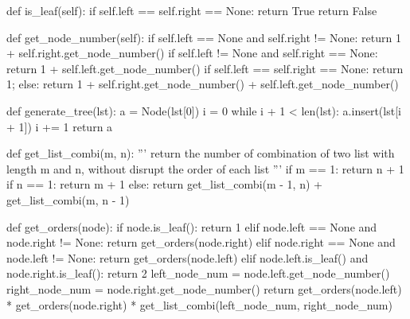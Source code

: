\documentclass{assignment-263}
\begin{document}
\begin{enumerate}
\begin{python}
                        
      def is_leaf(self):
            if self.left == self.right == None:
                  return True
            return False
                        
                        
                        
                        
                        
      def get_node_number(self):
            if self.left == None and self.right != None:
                  return 1 + self.right.get_node_number()
            if self.left != None and self.right == None:
                  return 1 + self.left.get_node_number()
            if self.left == self.right == None:
                  return 1;
            else:
                  return 1 + self.right.get_node_number() + self.left.get_node_number()
                        
                        

def generate_tree(lst):
      a = Node(lst[0])
      i = 0
      while i + 1 < len(lst):
            a.insert(lst[i + 1])
            i += 1
      return a


def get_list_combi(m, n):
      '''
      return the number of combination of two list with length m and n, without
      disrupt the order of each list
      '''
      if m == 1:
            return n + 1
      if n == 1:
            return m + 1
      else:
            return get_list_combi(m - 1, n) + get_list_combi(m, n - 1)

def get_orders(node):
      if node.is_leaf():
            return 1
      elif node.left == None and node.right != None:
            return get_orders(node.right)
      elif node.right == None and node.left != None:
            return get_orders(node.left)
      elif node.left.is_leaf() and node.right.is_leaf():
            return 2
      left_node_num = node.left.get_node_number()
      right_node_num = node.right.get_node_number()
      return get_orders(node.left) * get_orders(node.right) * get_list_combi(left_node_num, right_node_num)      



\end{python}
\end{enumerate}
\end{document}
